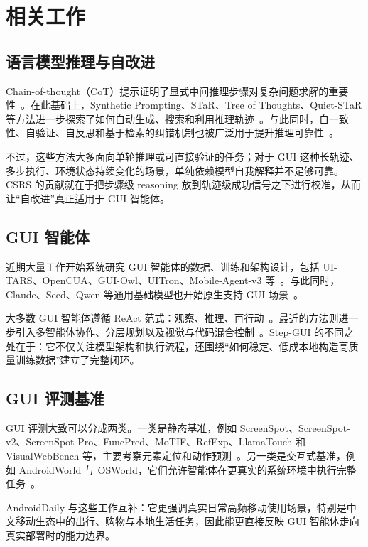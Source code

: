 \section{相关工作}

\subsection{语言模型推理与自改进}

Chain-of-thought（CoT）提示证明了显式中间推理步骤对复杂问题求解的重要性~\citep{wei2022chain_cot}。在此基础上，Synthetic Prompting、STaR、Tree of Thoughts、Quiet-STaR 等方法进一步探索了如何自动生成、搜索和利用推理轨迹~\citep{shao2023synthetic_synprompt, zelikman2022star, yao2023tree_tot, zelikman2024quiet_quietstar}。与此同时，自一致性、自验证、自反思和基于检索的纠错机制也被广泛用于提升推理可靠性~\citep{wang2022self_consistency, weng2023large_self_verification, madaan2023self_selfrefine, li2025cot_rag, niu2024mitigating, zheng2023ddcot}。

不过，这些方法大多面向单轮推理或可直接验证的任务；对于 GUI 这种长轨迹、多步执行、环境状态持续变化的场景，单纯依赖模型自我解释并不足够可靠。CSRS 的贡献就在于把步骤级 reasoning 放到轨迹级成功信号之下进行校准，从而让“自改进”真正适用于 GUI 智能体。

\subsection{GUI 智能体}

近期大量工作开始系统研究 GUI 智能体的数据、训练和架构设计，包括 UI-TARS、OpenCUA、GUI-Owl、UITron、Mobile-Agent-v3 等~\citep{qin2025ui_uitars1, wang2025ui_uitars2, wang2025opencua, ye2025mobile_mobileagentv3, zeng2025uitron}。与此同时，Claude、Seed、Qwen 等通用基础模型也开始原生支持 GUI 场景~\citep{claudeopus45, guo2025seed1, Bai2025Qwen3VL}。

大多数 GUI 智能体遵循 ReAct 范式：观察、推理、再行动~\citep{yao2022react}。最近的方法则进一步引入多智能体协作、分层规划以及视觉与代码混合控制~\citep{liu2025pc, song2025coact1, zhang2025ufo2, agashe2025agents2}。Step-GUI 的不同之处在于：它不仅关注模型架构和执行流程，还围绕“如何稳定、低成本地构造高质量训练数据”建立了完整闭环。

\subsection{GUI 评测基准}

GUI 评测大致可以分成两类。一类是静态基准，例如 ScreenSpot、ScreenSpot-v2、ScreenSpot-Pro、FuncPred、MoTIF、RefExp、LlamaTouch 和 VisualWebBench 等，主要考察元素定位和动作预测~\citep{cheng2024seeclick, wu2024atlas, li2025screenspotpro, li2025autogui, burns2022dataset_motif, rastogi2021uibert_refexp, zhang2024llamatouch, liu2024visualwebbench_vwb}。另一类是交互式基准，例如 AndroidWorld 与 OSWorld，它们允许智能体在更真实的系统环境中执行完整任务~\citep{rawles2024androidworld, xie2024osworld}。

AndroidDaily 与这些工作互补：它更强调真实日常高频移动使用场景，特别是中文移动生态中的出行、购物与本地生活任务，因此能更直接反映 GUI 智能体走向真实部署时的能力边界。
